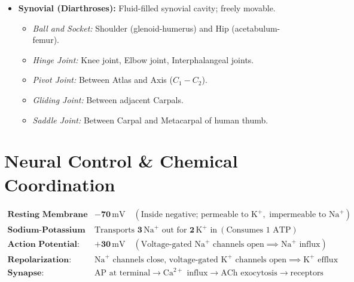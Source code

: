 \documentclass[10pt,a4paper]{article}
\begin{document}
\begin{conceptbox}
\begin{itemize}
\begin{itemize}
    \item \textbf{Synovial (Diarthroses):} Fluid-filled synovial cavity; freely movable.
    \begin{itemize}
      \item \textit{Ball and Socket:} Shoulder (glenoid-humerus) and Hip (acetabulum-femur).
      \item \textit{Hinge Joint:} Knee joint, Elbow joint, Interphalangeal joints.
      \item \textit{Pivot Joint:} Between Atlas and Axis ($C_1-C_2$).
      \item \textit{Gliding Joint:} Between adjacent Carpals.
      \item \textit{Saddle Joint:} Between Carpal and Metacarpal of human thumb.
    \end{itemize}
  \end{itemize}
\end{itemize}
\end{conceptbox}

\section{Neural Control \& Chemical Coordination}

\begin{formulabox}
\begin{align*}
  \textbf{Resting Membrane Potential: } & \mathbf{-70\,\mathrm{mV}} \quad (\text{Inside negative; permeable to } \mathrm{K}^+, \text{ impermeable to } \mathrm{Na}^+)\\
  \textbf{Sodium-Potassium Pump: } & \text{Transports } \mathbf{3\,\mathrm{Na}^+} \text{ out for } \mathbf{2\,\mathrm{K}^+} \text{ in} \ (\text{Consumes 1 ATP})\\
  \textbf{Action Potential: } & \mathbf{+30\,\mathrm{mV}} \quad (\text{Voltage-gated } \mathrm{Na}^+ \text{ channels open} \implies \mathrm{Na}^+ \text{ influx})\\
  \textbf{Repolarization: } & \mathrm{Na}^+ \text{ channels close, voltage-gated } \mathrm{K}^+ \text{ channels open} \implies \mathrm{K}^+ \text{ efflux}\\
  \textbf{Synapse: } & \text{AP at terminal} \to \mathrm{Ca}^{2+} \text{ influx} \to \text{ACh exocytosis} \to \text{receptors}
\end{align*}
\end{formulabox}
\end{document}
